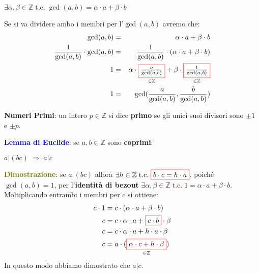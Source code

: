 \begin{itemize}[nosep]
\begin{boxA}
        {\centering
            $\exists \alpha, \beta \in \mathbb{Z} \; \text{t.c.} \; \gcd(a, b) = \alpha \cdot a + \beta \cdot b$
        \par}
        Se si va dividere ambo i membri per l'$\gcd (a, b)$ avremo che:
        \begin{align*}
            \gcd(a, b) &=& \alpha \cdot a + \beta \cdot b \\
            \frac{1}{\gcd (a, b)} \cdot \gcd (a, b) &=& \frac{1}{\gcd (a, b)} \cdot (\alpha \cdot a + \beta \cdot b) \\
            1 &=& \alpha \cdot \underset{\in \mathbb{Z}}{\fcolorbox{red}{white}{$\frac{a}{\gcd (a, b)}$}} + \beta \cdot \underset{\in \mathbb{Z}}{\fcolorbox{red}{white}{$\frac{1}{\gcd (a, b)}$}} \\
            1 &=& \gcd (\frac{a}{\gcd (a, b)}, \frac{b}{\gcd (a, b)})
        \end{align*}
    \end{boxA}
\end{itemize}
\textbf{Numeri Primi}: un intero $p \in \mathbb{Z}$ si dice \textbf{primo} se gli unici suoi divisori sono $\pm 1$ e $\pm p$.
\begin{boxA}
    \textcolor{blue}{\textbf{Lemma di Euclide}}: se $a, b \in \mathbb{Z}$ sono \textbf{coprimi}:
    
    {\centering
        $a|(bc) \; \Rightarrow \; a|c$
    \par}
    \textcolor{olive}{\textbf{Dimostrazione}}: se $a|(bc)$ allora $\exists h \in \mathbb{Z} \; \text{t.c.} \; \fcolorbox{red}{white}{$b \cdot c = h \cdot a$}$, poiché $\gcd (a, b) = 1$, per l'\textbf{identità di bezout} $\exists \alpha, \beta \in \mathbb{Z} \; \text{t.c.} \; 1 = \alpha \cdot a + \beta \cdot b$. \\
    Moltiplicando entrambi i membri per $c$ si ottiene:
    \begin{align*}
        c \cdot 1 &= c \cdot (\alpha \cdot a + \beta \cdot b) \\
        c &= c \cdot \alpha \cdot a + \fcolorbox{red}{white}{$c \cdot b$} \cdot \beta \\
        c &= c \cdot \alpha \cdot a + h \cdot a \cdot \beta \\
        c &= a \cdot (\underset{\in \mathbb{Z}}{\fcolorbox{red}{white}{$\alpha \cdot c + h \cdot \beta$}})
    \end{align*}
    In questo modo abbiamo dimostrato che $a|c$.
\end{boxA}

